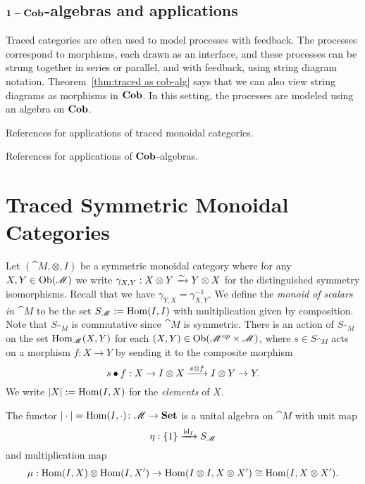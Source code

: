 \section{$\mathbf{1-Cob}$-algebras and applications}

Traced categories are often used to model processes with feedback. The processes correspond to morphisms, each drawn as an interface, and these processes can be strung together in series or parallel, and with feedback, using string diagram notation. Theorem~\ref{thm:traced as cob-alg} says that we can also view string diagrams as morphisms in $\mathbf{Cob}$. In this setting, the processes are modeled using an algebra on $\mathbf{Cob}$.

References for applications of traced monoidal categories.

References for applications of $\mathbf{Cob}$-algebras.

\chapter{Traced Symmetric Monoidal Categories}

Let $(\cat{M},\otimes,I)$ be a symmetric monoidal category where for any $X,Y\in\operatorname{Ob}(\mathscr{M})$ we write $\gamma_{X,Y}:X\otimes Y\xrightarrow{\sim} Y\otimes X$ for the distinguished symmetry isomorphisms. Recall that we have $\gamma_{Y,X}=\gamma_{X,Y}^{-1}$.  We define the {\em monoid of scalars in $\cat{M}$} to be the set $S_{\mathscr{M}}:=\operatorname{Hom}(I,I)$ with multiplication given by composition.  Note that $S_{\cat{M}}$ is commutative since $\cat{M}$ is symmetric.  There is an action of $S_{\cat{M}}$ on the set $\operatorname{Hom}_{\mathscr{M}}(X,Y)$ for each $(X,Y)\in\operatorname{Ob}(\mathscr{M}^{op}\times\mathscr{M})$, where $s\in S_{\cat{M}}$ acts on a morphism $f\colon X\to Y$ by sending it to the composite morphism
$$s\bullet f:X\to I\otimes X\xrightarrow{s\otimes f}I\otimes Y\to Y.$$
We write $|X|:=\operatorname{Hom}(I,X)$ for the \emph{elements} of $X$.

The functor $|\cdot|=\operatorname{Hom}(I,\cdot)\colon\mathscr{M}\to\mathbf{Set}$ is a unital  algebra on $\cat{M}$ with unit map
\[\eta:\{1\}\xrightarrow{\operatorname{id}_{I}}S_{\mathscr{M}}\]
and multiplication map
\[\mu:\operatorname{Hom}(I,X)\otimes\operatorname{Hom}(I,X')\to\operatorname{Hom}(I\otimes I,X\otimes X')\cong\operatorname{Hom}(I,X\otimes X').\]

